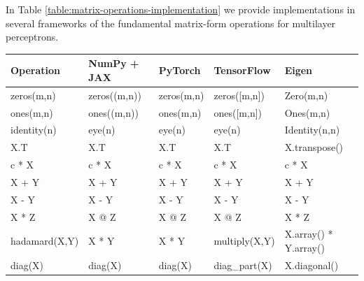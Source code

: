 \documentclass{article}
\begin{document}
\clearpage
In Table \ref{table:matrix-operations-implementation} we provide implementations in several frameworks of the fundamental matrix-form operations for multilayer perceptrons.
\begin{table}[htb]
\scriptsize
\centering
\begin{tabular}{ p{2.2cm}|p{2.6cm}p{2.6cm}p{2.6cm}p{3.6cm} }
 \toprule
 Operation & NumPy + JAX & PyTorch & TensorFlow & Eigen\\
 \midrule
\textsf{zeros(m,n)}            & \textsf{zeros((m,n))}           & \textsf{zeros(m,n)}              & \textsf{zeros([m,n])}                & \textsf{Zero(m,n)}                      \\
\textsf{ones(m,n)}             & \textsf{ones((m,n))}            & \textsf{ones(m,n)}               & \textsf{ones([m,n])}                 & \textsf{Ones(m,n)}                      \\
\textsf{identity(n)}           & \textsf{eye(n)}                 & \textsf{eye(n)}                  & \textsf{eye(n)}                      & \textsf{Identity(n,n)}                  \\
\textsf{X.T}                   & \textsf{X.T}                    & \textsf{X.T}                     & \textsf{X.T}                         & \textsf{X.transpose()}                   \\
\textsf{c * X}                 & \textsf{c * X}                  & \textsf{c * X}                   & \textsf{c * X}                       & \textsf{c * X}                           \\
\textsf{X + Y}                 & \textsf{X + Y}                  & \textsf{X + Y}                   & \textsf{X + Y}                       & \textsf{X + Y}                           \\
\textsf{X - Y}                 & \textsf{X - Y}                  & \textsf{X - Y}                   & \textsf{X - Y}                       & \textsf{X - Y}                           \\
\textsf{X * Z}                 & \textsf{X @ Z}                  & \textsf{X @ Z}                   & \textsf{X @ Z}                       & \textsf{X * Z}                           \\
\textsf{hadamard(X,Y)}         & \textsf{X * Y}                  & \textsf{X * Y}                   & \textsf{multiply(X,Y)}               & \textsf{X.array() * Y.array()}           \\
\textsf{diag(X)}               & \textsf{diag(X)}                & \textsf{diag(X)}                 & \textsf{diag\_part(X)}               & \textsf{X.diagonal()}                    \\

\end{tabular}
\end{table}
\end{document}
